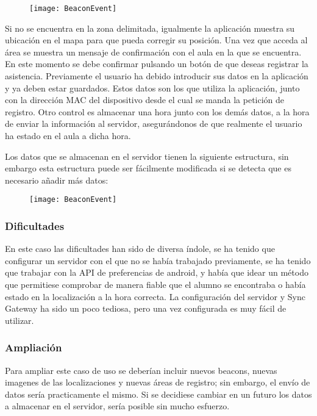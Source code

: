 \begin{figure}[H]
	\centering
	\texttt{[image: BeaconEvent]}
	\label{fig:eventBeacon}
\end{figure}

Si no se encuentra en la zona delimitada, igualmente la aplicación muestra su ubicación en el mapa para que pueda corregir su posición. Una vez que acceda al área se muestra un mensaje de confirmación con el aula en la que se encuentra. En este momento se debe confirmar pulsando un botón de que deseas registrar la asistencia. Previamente el usuario ha debido introducir sus datos en la aplicación y ya deben estar guardados. Estos datos son los que utiliza la aplicación, junto con la dirección MAC del dispositivo desde el cual se manda la petición de registro. Otro control es almacenar una hora junto con los demás datos, a la hora de enviar la información al servidor, asegurándonos de que realmente el usuario ha estado en el aula a dicha hora.


Los datos que se almacenan en el servidor tienen la siguiente estructura, sin embargo esta estructura puede ser fácilmente modificada si se detecta que es necesario añadir más datos: 

\begin{figure}[H]
	\centering
	\texttt{[image: BeaconEvent]}
	\label{fig:eventBeacon}
\end{figure}


\subsubsection{Dificultades}

En este caso las dificultades han sido de diversa índole, se ha tenido que configurar un servidor con el que no se había trabajado previamente, se ha tenido que trabajar con la API de preferencias de android, y había que idear un método que permitiese comprobar de manera fiable que el alumno se encontraba o había estado en la localización a la hora correcta. La configuración del servidor y Sync Gateway ha sido un poco tediosa, pero una vez configurada es muy fácil de utilizar.


\subsubsection{Ampliación}

Para ampliar este caso de uso se deberían incluir nuevos beacons, nuevas imagenes de las localizaciones y nuevas áreas de registro; sin embargo, el envío de datos sería practicamente el mismo. Si se decidiese cambiar en un futuro los datos a almacenar en el servidor, sería posible sin mucho esfuerzo.

